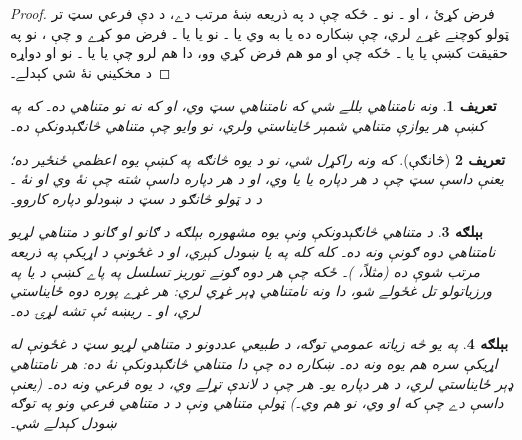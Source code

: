 \documentclass[12pt,a4paper,oneside]{report}
\newcommand{\Setabs}[2]{\{#1 : #2\}}
\newcommand{\Nat}{\mathbb{N}}
\newcommand{\Bin}{\mathbb{B}}
\newcommand{\tuple}[1]{\langle #1\rangle}
\newcommand{\emptyseq}{\Lambda}
\newtheorem{defn}{تعريف}[section]
\newtheorem{ex}[defn]{بېلګه}
\begin{document}
\begin{proof}
  فرض کړئ ،  او ۔ نو
  \LR{$\{y_1, y_2\} \subseteq \Setabs{z}{z<x}$}۔ ځکه چې
  \LR{$\Setabs{z}{z<x}$} د \LR{$\le$} په ذريعه ښۀ مرتب دے، د دې فرعي سټ
   تر ټولو کوچنے غړے لري، چې ښکاره ده يا به 
  وي يا ۔ نو يا  يا ۔ فرض مو
  کړے و چې ، نو په حقيقت کښې يا  يا
  ۔ ځکه چې  او  مو هم فرض کړي وو،
  دا هم لرو چې يا  يا ۔ نو
   او  دواړه د  مخکيني نۀ شي کېدلے۔
\end{proof}

\begin{defn}
ونه \LR{$T = \tuple{A, \le}$} \emph{نامتناهي} بللے شي که  نامتناهي
سټ وي، او که نه نو \emph{متناهي} ده۔ که په  کښې هر 
يوازې متناهي شمېر ځايناستي ولري، نو وايو چې 
\emph{متناهي څانګېدونکې} ده۔
\end{defn}

\begin{defn}[څانګې]
که ونه \LR{$T = \tuple{A, \le}$} راکړل شي، نو د  يوه \emph{څانګه}
په  کښې يوه اعظمي ځنځير ده؛ يعنې داسې سټ  چې
د هر  دپاره يا  يا  وي، او د
هر  دپاره داسې  شته چې نۀ
 وي او نۀ ۔
%
د  د ټولو څانګو د سټ د ښودلو دپاره \LR{$[T]$} کاروو۔
\end{defn}

\begin{ex}
د متناهي څانګېدونکې ونې يوه مشهوره بېلګه د  ګانو او  ګانو
د متناهي لړيو \emph{نامتناهي دوه ګونې ونه} ده۔ کله کله په
 يا \LR{$\Bin^*$} ښودل کېږي، او د غځونې د اړيکې
\LR{$\sqsubseteq$} په ذريعه مرتب شوې ده (مثلاً، )۔
ځکه چې هر دوه ګونے توريز تسلسل په پاے کښې د  يا  په
ورزياتولو تل غځولے شو، دا ونه نامتناهي ډېر غړي لري: هر غړے 
پوره دوه ځايناستي لري،  او ۔ ريښه ئې تشه لړۍ \LR{$\emptyseq$} ده۔
\end{ex}

\begin{ex}
په يو څه زياته عمومي توګه، د طبيعي عددونو د متناهي لړيو سټ
\LR{$\Nat^*$} د غځونې له اړيکې \LR{$\sqsubseteq$} سره هم يوه ونه ده۔
ښکاره ده چې دا متناهي څانګېدونکې نۀ ده: هر \LR{$s \in \Nat^*$}
نامتناهي ډېر ځايناستي  لري، د هر \LR{$n \in \Nat$} دپاره يو۔
هر \LR{$A \subseteq \Nat^*$} چې د \LR{$\sqsubseteq$} لاندې تړلے وي، د
\LR{$\Nat^*$} يوه \emph{فرعي ونه} ده۔ (يعنې  داسې دے چې که
 او  وي، نو  هم وي۔)
ټولې متناهي ونې د \LR{$\Nat^*$} د متناهي فرعي ونو په توګه ښودل کېدلے شي۔
\end{ex}
\end{document}
